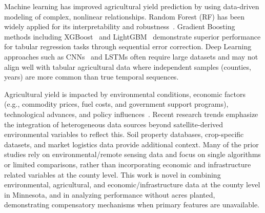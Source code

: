 \documentclass[10pt,twocolumn]{article}
\begin{document}
\begin{table}[htb]
    \centering
    \caption{Data Sources Summary}
    \label{tab:data_sources}
\end{table}

Machine learning has improved agricultural yield prediction by using data-driven modeling of complex, nonlinear relationships.
Random Forest (RF) has been widely applied for its interpretability and robustness~\cite{prasetyo2024random}.
Gradient Boosting methods including XGBoost~\cite{chen2016xgboost} and LightGBM~\cite{ke2017lightgbm} demonstrate superior performance for tabular regression tasks through sequential error correction.
Deep Learning approaches such as CNNs~\cite{nevavuori2020crop, shahhosseini2021cnn} and LSTMs often require large datasets and may not align well with tabular agricultural data where independent samples (counties, years) are more common than true temporal sequences.

Agricultural yield is impacted by environmental conditions, economic factors (e.g., commodity prices, fuel costs, and government support programs), technological advances, and policy influences~\cite{desloires2024corn, ji2022corn}.
Recent research trends emphasize the integration of heterogeneous data sources beyond satellite-derived environmental variables to reflect this.
Soil property databases, crop-specific datasets, and market logistics data provide additional context.
Many of the prior studies rely on environmental/remote sensing data and focus on single algorithms or limited comparisons, rather than incorporating economic and infrastructure related variables at the county level.
This work is novel in combining environmental, agricultural, and economic/infrastructure data at the county level in Minnesota, and in analyzing performance without acres planted, demonstrating compensatory mechanisms when primary features are unavailable.
\end{document}
